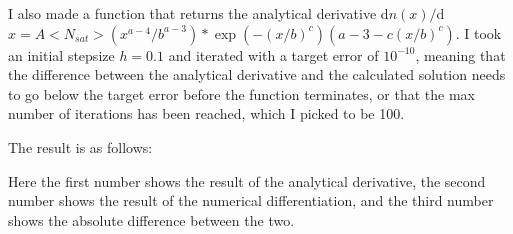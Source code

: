 I also made a function that returns the analytical derivative d$n(x)/$d$x = A <N_{sat}> (x^{a-4}/b^{a-3})*\exp(-(x/b)^c)  (a-3-c (x/b)^c)$.
I took an initial stepsize $h = 0.1$ and iterated with a target error of $10^{-10}$, meaning that the difference between the analytical derivative and the calculated solution needs to go below the target error before the function terminates, or that the max number of iterations has been reached, which I picked to be 100.

The result is as follows:



Here the first number shows the result of the analytical derivative, the second number shows the result of the numerical differentiation, and the third number shows the absolute difference between the two.


